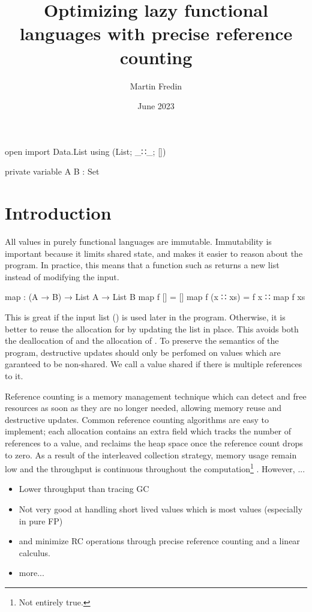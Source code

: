 \documentclass{article}
\title{Optimizing lazy functional languages with precise reference counting}
\author{Martin Fredin}
\date{June 2023}
\begin{document}
\maketitle

\begin{code}[hide]
open import Data.List using (List; _∷_; [])

private 
  variable
    A B : Set

\end{code}

\section{Introduction}

All values in purely functional languages are immutable.
Immutability is important because it limits shared state, and makes it easier to reason about the program.
In practice, this means that a function such as  returns a new list instead of modifying the input.
\begin{code}
map : (A → B) → List A → List B
map f []       = []
map f (x ∷ xs) = f x ∷ map f xs
\end{code}
This is great if the input list (\AgdaSpace{}) is used later in the program. 
Otherwise, it is better to reuse the allocation for \AgdaSpace{} by updating the list in place. 
This avoids both the deallocation of \AgdaSpace{} and the allocation of \AgdaSpace{}.
To preserve the semantics of the program, destructive updates should only be perfomed on values which are garanteed to be non-shared. 
We call a value shared if there is multiple references to it.

Reference counting \citep{collins1960} is a memory management technique which can detect and free resources as soon as they are no longer needed, allowing memory reuse and destructive updates. 
Common reference counting algorithms are easy to implement; each allocation contains an extra field which tracks the number of references to a value, and reclaims the heap space once the reference count drops to zero. 
As a result of the interleaved collection strategy, memory usage remain low and the throughput is continuous throughout the computation\footnote{Not entirely true.} \citep{jones1996}.
However, ...

\begin{itemize}
\item Lower throughput than tracing GC
\item Not very good at handling short lived values which is most values (especially in pure FP)
\item \citet{reinking2021} and \citet{ullrich2021} minimize RC operations through precise reference counting and a linear calculus.
\item more...
\end{itemize}
\end{document}
